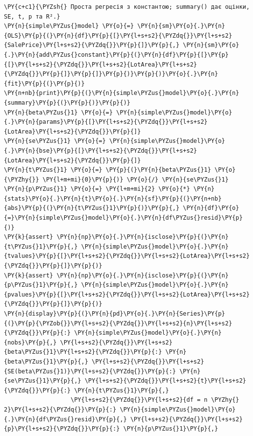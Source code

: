 \begin{Verbatim}[commandchars=\\\{\}]
\PY{c+c1}{\PYZsh{} Проста регресія з константою; summary() дає оцінки, SE, t, p та R².}
\PY{n}{simple\PYZus{}model} \PY{o}{=} \PY{n}{sm}\PY{o}{.}\PY{n}{OLS}\PY{p}{(}\PY{n}{df}\PY{p}{[}\PY{l+s+s2}{\PYZdq{}}\PY{l+s+s2}{SalePrice}\PY{l+s+s2}{\PYZdq{}}\PY{p}{]}\PY{p}{,} \PY{n}{sm}\PY{o}{.}\PY{n}{add\PYZus{}constant}\PY{p}{(}\PY{n}{df}\PY{p}{[}\PY{p}{[}\PY{l+s+s2}{\PYZdq{}}\PY{l+s+s2}{LotArea}\PY{l+s+s2}{\PYZdq{}}\PY{p}{]}\PY{p}{]}\PY{p}{)}\PY{p}{)}\PY{o}{.}\PY{n}{fit}\PY{p}{(}\PY{p}{)}
\PY{n+nb}{print}\PY{p}{(}\PY{n}{simple\PYZus{}model}\PY{o}{.}\PY{n}{summary}\PY{p}{(}\PY{p}{)}\PY{p}{)}
\PY{n}{beta\PYZus{}1} \PY{o}{=} \PY{n}{simple\PYZus{}model}\PY{o}{.}\PY{n}{params}\PY{p}{[}\PY{l+s+s2}{\PYZdq{}}\PY{l+s+s2}{LotArea}\PY{l+s+s2}{\PYZdq{}}\PY{p}{]}
\PY{n}{se\PYZus{}1} \PY{o}{=} \PY{n}{simple\PYZus{}model}\PY{o}{.}\PY{n}{bse}\PY{p}{[}\PY{l+s+s2}{\PYZdq{}}\PY{l+s+s2}{LotArea}\PY{l+s+s2}{\PYZdq{}}\PY{p}{]}
\PY{n}{t\PYZus{}1} \PY{o}{=} \PY{p}{(}\PY{n}{beta\PYZus{}1} \PY{o}{\PYZhy{}} \PY{l+m+mi}{0}\PY{p}{)} \PY{o}{/} \PY{n}{se\PYZus{}1}
\PY{n}{p\PYZus{}1} \PY{o}{=} \PY{l+m+mi}{2} \PY{o}{*} \PY{n}{stats}\PY{o}{.}\PY{n}{t}\PY{o}{.}\PY{n}{sf}\PY{p}{(}\PY{n+nb}{abs}\PY{p}{(}\PY{n}{t\PYZus{}1}\PY{p}{)}\PY{p}{,} \PY{n}{df}\PY{o}{=}\PY{n}{simple\PYZus{}model}\PY{o}{.}\PY{n}{df\PYZus{}resid}\PY{p}{)}
\PY{k}{assert} \PY{n}{np}\PY{o}{.}\PY{n}{isclose}\PY{p}{(}\PY{n}{t\PYZus{}1}\PY{p}{,} \PY{n}{simple\PYZus{}model}\PY{o}{.}\PY{n}{tvalues}\PY{p}{[}\PY{l+s+s2}{\PYZdq{}}\PY{l+s+s2}{LotArea}\PY{l+s+s2}{\PYZdq{}}\PY{p}{]}\PY{p}{)}
\PY{k}{assert} \PY{n}{np}\PY{o}{.}\PY{n}{isclose}\PY{p}{(}\PY{n}{p\PYZus{}1}\PY{p}{,} \PY{n}{simple\PYZus{}model}\PY{o}{.}\PY{n}{pvalues}\PY{p}{[}\PY{l+s+s2}{\PYZdq{}}\PY{l+s+s2}{LotArea}\PY{l+s+s2}{\PYZdq{}}\PY{p}{]}\PY{p}{)}
\PY{n}{display}\PY{p}{(}\PY{n}{pd}\PY{o}{.}\PY{n}{Series}\PY{p}{(}\PY{p}{\PYZob{}}\PY{l+s+s2}{\PYZdq{}}\PY{l+s+s2}{n}\PY{l+s+s2}{\PYZdq{}}\PY{p}{:} \PY{n}{simple\PYZus{}model}\PY{o}{.}\PY{n}{nobs}\PY{p}{,} \PY{l+s+s2}{\PYZdq{}}\PY{l+s+s2}{beta\PYZus{}1}\PY{l+s+s2}{\PYZdq{}}\PY{p}{:} \PY{n}{beta\PYZus{}1}\PY{p}{,} \PY{l+s+s2}{\PYZdq{}}\PY{l+s+s2}{SE(beta\PYZus{}1)}\PY{l+s+s2}{\PYZdq{}}\PY{p}{:} \PY{n}{se\PYZus{}1}\PY{p}{,} \PY{l+s+s2}{\PYZdq{}}\PY{l+s+s2}{t}\PY{l+s+s2}{\PYZdq{}}\PY{p}{:} \PY{n}{t\PYZus{}1}\PY{p}{,}
                   \PY{l+s+s2}{\PYZdq{}}\PY{l+s+s2}{df = n \PYZhy{} 2}\PY{l+s+s2}{\PYZdq{}}\PY{p}{:} \PY{n}{simple\PYZus{}model}\PY{o}{.}\PY{n}{df\PYZus{}resid}\PY{p}{,} \PY{l+s+s2}{\PYZdq{}}\PY{l+s+s2}{p}\PY{l+s+s2}{\PYZdq{}}\PY{p}{:} \PY{n}{p\PYZus{}1}\PY{p}{,}

\end{Verbatim}
